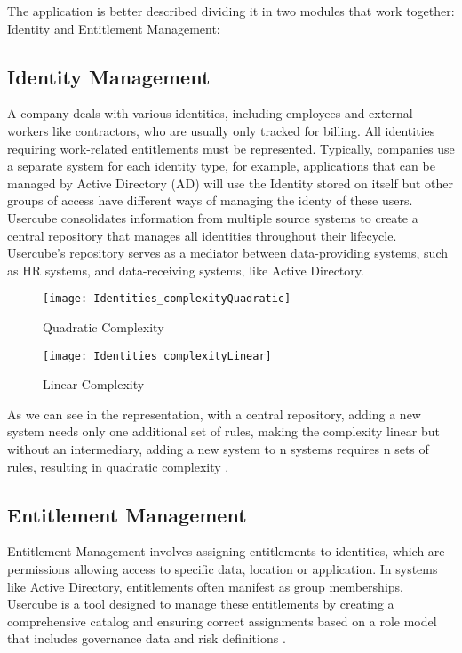The application is better described dividing it in two modules that work together: Identity and Entitlement Management:

\subsection{Identity Management}

A company deals with various identities, including employees and external workers like contractors, who are usually only tracked for billing. All identities requiring work-related entitlements must be represented. Typically, companies use a separate system for each identity type, for example, applications that can be managed by Active Directory (AD) will use the Identity stored on itself but other groups of access have different ways of managing the identy of these users. Usercube consolidates information from multiple source systems to create a central repository that manages all identities throughout their lifecycle. Usercube's repository serves as a mediator between data-providing systems, such as HR systems, and data-receiving systems, like Active Directory.

\begin{figure}[htbp]
  \centering
  \begin{minipage}{0.48\textwidth}
    \texttt{[image: Identities\_complexityQuadratic]}
    \caption{Quadratic Complexity}
    \label{fig:Identities_complexityQuadratic}
  \end{minipage}\hfill
  \begin{minipage}{0.48\textwidth}
    \texttt{[image: Identities\_complexityLinear]}
    \caption{Linear Complexity}
    \label{fig:Identities_complexityLinear}
  \end{minipage}
\end{figure}

As we can see in the representation, with a central repository, adding a new system needs only one additional set of rules, making the complexity linear but without an intermediary, adding a new system to n systems requires n sets of rules, resulting in quadratic complexity \cite{UsercubeDocument}.

\subsection{Entitlement Management}

Entitlement Management involves assigning entitlements to identities, which are permissions allowing access to specific data, location or application. In systems like Active Directory, entitlements often manifest as group memberships. Usercube is a tool designed to manage these entitlements by creating a comprehensive catalog and ensuring correct assignments based on a role model that includes governance data and risk definitions \cite{UsercubeDocument}.

